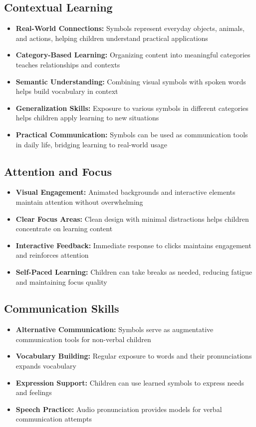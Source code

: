 \documentclass[12pt,a4paper]{article}
\begin{document}
\subsection{Contextual Learning}
\begin{itemize}[leftmargin=*]
    \item \textbf{Real-World Connections:} Symbols represent everyday objects, animals, and actions, helping children understand practical applications
    \item \textbf{Category-Based Learning:} Organizing content into meaningful categories teaches relationships and contexts
    \item \textbf{Semantic Understanding:} Combining visual symbols with spoken words helps build vocabulary in context
    \item \textbf{Generalization Skills:} Exposure to various symbols in different categories helps children apply learning to new situations
    \item \textbf{Practical Communication:} Symbols can be used as communication tools in daily life, bridging learning to real-world usage
\end{itemize}

\subsection{Attention and Focus}
\begin{itemize}[leftmargin=*]
    \item \textbf{Visual Engagement:} Animated backgrounds and interactive elements maintain attention without overwhelming
    \item \textbf{Clear Focus Areas:} Clean design with minimal distractions helps children concentrate on learning content
    \item \textbf{Interactive Feedback:} Immediate response to clicks maintains engagement and reinforces attention
    \item \textbf{Self-Paced Learning:} Children can take breaks as needed, reducing fatigue and maintaining focus quality
\end{itemize}

\subsection{Communication Skills}
\begin{itemize}[leftmargin=*]
    \item \textbf{Alternative Communication:} Symbols serve as augmentative communication tools for non-verbal children
    \item \textbf{Vocabulary Building:} Regular exposure to words and their pronunciations expands vocabulary
    \item \textbf{Expression Support:} Children can use learned symbols to express needs and feelings
    \item \textbf{Speech Practice:} Audio pronunciation provides models for verbal communication attempts
\end{itemize}
\end{document}
